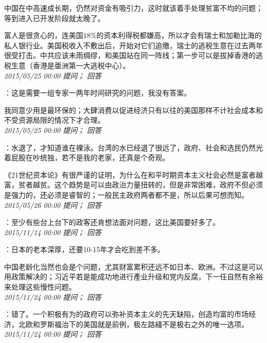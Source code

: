 \documentclass[twocolumn]{ctexart}
\begin{document}
中国在中高速成长期，仍然对资金有吸引力，这时就该着手处理贫富不均的问题；等到进入已开发阶段就太晚了。

富人是很贪心的，连美国18\%的资本利得税都嫌高，所以才会有瑞士和加勒比海的私人银行业。美国税收入不敷出后，开始对它们追缴，瑞士的逃税生意在过去两年很受打击。中共应该未雨绸缪，和美国站在同一阵线；第一步可以是拔掉香港的逃税生意（香港是亜洲第一大逃税中心）。\\

\textit{\hfill\noindent\small 2015/05/25 00:00 提问； 回答}

：这是需要一组专家一两年时间研究的问题，我没有答案。

我同意少用是最环保的；大肆消费以促进经济只有以往的美国那样不计社会成本和不受资源局限的情况下才合理。\\

\textit{\hfill\noindent\small 2015/05/25 00:00 提问； 回答}

：水退了，才知道谁在裸泳。台湾的水已经退了很远了，政府、社会和选民仍然光着屁股在吵统独，若不是我的老家，还真是个奇观。

《21世纪资本论》有很严谨的证明，为什么在和平时期资本主义社会必然是富者越富，贫者越贫。这个趋势是可以由政治力量扭转的，但是非常困难，政府不但必须是强力的，还必须是睿智的；一般民主政府两者都不是，所以后果可想而知。\\

\textit{\hfill\noindent\small 2015/05/26 00:00 提问； 回答}

：至少有些台上台下的政客还肯想法面对问题，这比美国要好多了。\\

\textit{\hfill\noindent\small 2015/11/14 00:00 提问； 回答}

：日本的老本深厚，还要10-15年才会吃到差不多。

中国老龄化当然也会是个问题，尤其财富累积还远不如日本、欧洲。不过这是可以用政策解决的；习近平若是能成功地进行產业升级和党内反腐，下一任自然有余裕来处理这些慢性问题。\\

\textit{\hfill\noindent\small 2015/11/24 00:00 提问； 回答}

：错了。一个积极有为的政府可以弥补资本主义的先天缺陷，创造均富的市场经济，北欧和罗斯福治下的美国就是前例，极左路綫不是极右之外的唯一选项。\\

\textit{\hfill\noindent\small 2015/11/24 00:00 提问； 回答}
\end{document}
